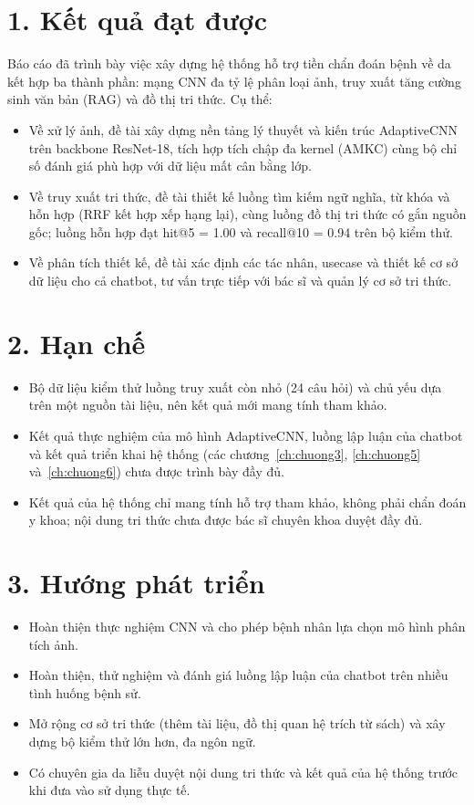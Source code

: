 
\section*{1. Kết quả đạt được}


Báo cáo đã trình bày việc xây dựng hệ thống hỗ trợ tiền chẩn đoán bệnh về da kết hợp ba thành phần: mạng CNN đa tỷ lệ phân loại ảnh, truy xuất tăng cường sinh văn bản (RAG) và đồ thị tri thức. Cụ thể:
\begin{itemize}
  \item Về xử lý ảnh, đề tài xây dựng nền tảng lý thuyết và kiến trúc AdaptiveCNN trên backbone ResNet-18, tích hợp tích chập đa kernel (AMKC) cùng bộ chỉ số đánh giá phù hợp với dữ liệu mất cân bằng lớp.
  \item Về truy xuất tri thức, đề tài thiết kế luồng tìm kiếm ngữ nghĩa, từ khóa và hỗn hợp (RRF kết hợp xếp hạng lại), cùng luồng đồ thị tri thức có gắn nguồn gốc; luồng hỗn hợp đạt hit@5 = 1.00 và recall@10 = 0.94 trên bộ kiểm thử.
  \item Về phân tích thiết kế, đề tài xác định các tác nhân, usecase và thiết kế cơ sở dữ liệu cho cả chatbot, tư vấn trực tiếp với bác sĩ và quản lý cơ sở tri thức.
\end{itemize}

\section*{2. Hạn chế}

\begin{itemize}
  \item Bộ dữ liệu kiểm thử luồng truy xuất còn nhỏ (24 câu hỏi) và chủ yếu dựa trên một nguồn tài liệu, nên kết quả mới mang tính tham khảo.
  \item Kết quả thực nghiệm của mô hình AdaptiveCNN, luồng lập luận của chatbot và kết quả triển khai hệ thống (các chương~\ref{ch:chuong3}, \ref{ch:chuong5} và~\ref{ch:chuong6}) chưa được trình bày đầy đủ.
  \item Kết quả của hệ thống chỉ mang tính hỗ trợ tham khảo, không phải chẩn đoán y khoa; nội dung tri thức chưa được bác sĩ chuyên khoa duyệt đầy đủ.
\end{itemize}

\section*{3. Hướng phát triển}

\begin{itemize}
  \item Hoàn thiện thực nghiệm CNN và cho phép bệnh nhân lựa chọn mô hình phân tích ảnh.
  \item Hoàn thiện, thử nghiệm và đánh giá luồng lập luận của chatbot trên nhiều tình huống bệnh sử.
  \item Mở rộng cơ sở tri thức (thêm tài liệu, đồ thị quan hệ trích từ sách) và xây dựng bộ kiểm thử lớn hơn, đa ngôn ngữ.
  \item Có chuyên gia da liễu duyệt nội dung tri thức và kết quả của hệ thống trước khi đưa vào sử dụng thực tế.
\end{itemize}
